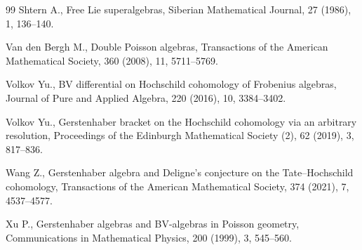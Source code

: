 \documentclass[11pt,reqno]{amsart}
\theoremstyle{plain}
\theoremstyle{definition}
\theoremstyle{remark}
\begin{document}
\begin{thebibliography}{99}
Shtern A.,
Free Lie superalgebras,
Siberian Mathematical Journal, 27 (1986), 1, 136--140.

Van den Bergh M.,
Double Poisson algebras,
Transactions of the American Mathematical Society, 360 (2008), 11, 5711--5769.

Volkov Yu.,
BV differential on Hochschild cohomology of Frobenius algebras,
Journal of Pure and Applied Algebra, 220 (2016), 10, 3384--3402.

Volkov Yu.,
Gerstenhaber bracket on the Hochschild cohomology via an arbitrary resolution,
Proceedings of the Edinburgh Mathematical Society (2), 62 (2019), 3, 817--836.

Wang Z.,
Gerstenhaber algebra and Deligne's conjecture on the Tate--Hochschild cohomology,
Transactions of the American Mathematical Society, 374 (2021), 7, 4537--4577.

Xu P.,
Gerstenhaber algebras and BV-algebras in Poisson geometry,
Communications in Mathematical Physics, 200 (1999), 3, 545--560.

\end{thebibliography}
\end{document}
